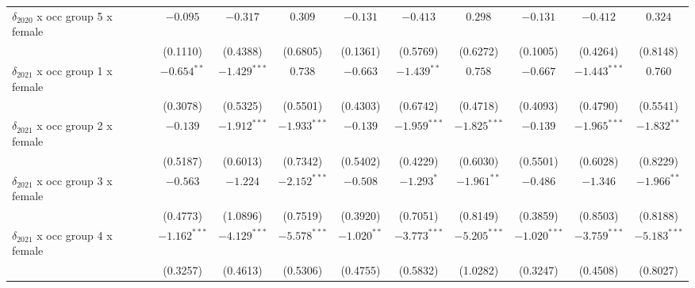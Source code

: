 \begin{tabular}{l|ccc|ccc|ccc|}
$\delta_{2020}$ x occ group 5 x female &                $-0.095$ &        $-0.317$ &         $0.309$ &                 $-0.131$ &        $-0.413$ &         $0.298$ &                 $-0.131$ &        $-0.412$ &         $0.324$ \\
                                       &                (0.1110) &        (0.4388) &        (0.6805) &                 (0.1361) &        (0.5769) &        (0.6272) &                 (0.1005) &        (0.4264) &        (0.8148) \\
$\delta_{2021}$ x occ group 1 x female &           $-0.654^{**}$ &  $-1.429^{***}$ &         $0.738$ &                 $-0.663$ &   $-1.439^{**}$ &         $0.758$ &                 $-0.667$ &  $-1.443^{***}$ &         $0.760$ \\
                                       &                (0.3078) &        (0.5325) &        (0.5501) &                 (0.4303) &        (0.6742) &        (0.4718) &                 (0.4093) &        (0.4790) &        (0.5541) \\
$\delta_{2021}$ x occ group 2 x female &                $-0.139$ &  $-1.912^{***}$ &  $-1.933^{***}$ &                 $-0.139$ &  $-1.959^{***}$ &  $-1.825^{***}$ &                 $-0.139$ &  $-1.965^{***}$ &   $-1.832^{**}$ \\
                                       &                (0.5187) &        (0.6013) &        (0.7342) &                 (0.5402) &        (0.4229) &        (0.6030) &                 (0.5501) &        (0.6028) &        (0.8229) \\
$\delta_{2021}$ x occ group 3 x female &                $-0.563$ &        $-1.224$ &  $-2.152^{***}$ &                 $-0.508$ &      $-1.293^*$ &   $-1.961^{**}$ &                 $-0.486$ &        $-1.346$ &   $-1.966^{**}$ \\
                                       &                (0.4773) &        (1.0896) &        (0.7519) &                 (0.3920) &        (0.7051) &        (0.8149) &                 (0.3859) &        (0.8503) &        (0.8188) \\
$\delta_{2021}$ x occ group 4 x female &          $-1.162^{***}$ &  $-4.129^{***}$ &  $-5.578^{***}$ &            $-1.020^{**}$ &  $-3.773^{***}$ &  $-5.205^{***}$ &           $-1.020^{***}$ &  $-3.759^{***}$ &  $-5.183^{***}$ \\
                                       &                (0.3257) &        (0.4613) &        (0.5306) &                 (0.4755) &        (0.5832) &        (1.0282) &                 (0.3247) &        (0.4508) &        (0.8027) \\

\end{tabular}
